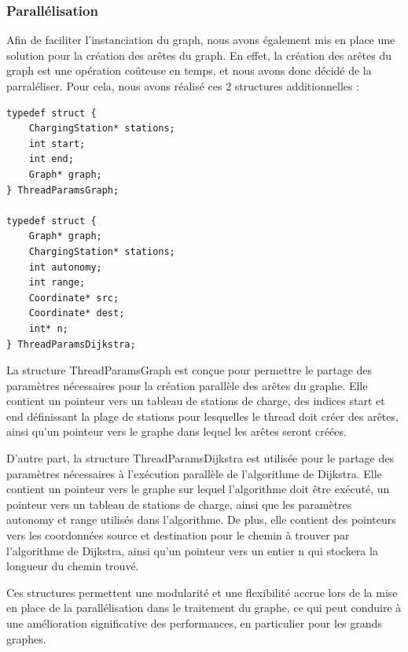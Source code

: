 \documentclass[french,a4paper]{article}
\begin{document}
\subsubsection{Parallélisation}

Afin de faciliter l'instanciation du graph, nous avons également mis en place une solution pour la création des arêtes du graph. En effet, la création des arêtes du graph est une opération coûteuse en temps, et nous avons donc décidé de la parraléliser. Pour cela, nous avons réalisé ces 2 structures additionnelles :

\begin{center}
    \begin{lstlisting}[caption=Structure Annexes à Graph]
typedef struct {
    ChargingStation* stations;
    int start;
    int end;
    Graph* graph;
} ThreadParamsGraph;

typedef struct {
    Graph* graph;
    ChargingStation* stations;
    int autonomy;
    int range;
    Coordinate* src;
    Coordinate* dest;
    int* n;
} ThreadParamsDijkstra;
\end{lstlisting}
\end{center}

La structure ThreadParamsGraph est conçue pour permettre le partage des paramètres nécessaires pour la création parallèle des arêtes du graphe. Elle contient un pointeur vers un tableau de stations de charge, des indices start et end définissant la plage de stations pour lesquelles le thread doit créer des arêtes, ainsi qu'un pointeur vers le graphe dans lequel les arêtes seront créées.

D'autre part, la structure ThreadParamsDijkstra est utilisée pour le partage des paramètres nécessaires à l'exécution parallèle de l'algorithme de Dijkstra. Elle contient un pointeur vers le graphe sur lequel l'algorithme doit être exécuté, un pointeur vers un tableau de stations de charge, ainsi que les paramètres autonomy et range utilisés dans l'algorithme. De plus, elle contient des pointeurs vers les coordonnées source et destination pour le chemin à trouver par l'algorithme de Dijkstra, ainsi qu'un pointeur vers un entier n qui stockera la longueur du chemin trouvé.

Ces structures permettent une modularité et une flexibilité accrue lors de la mise en place de la parallélisation dans le traitement du graphe, ce qui peut conduire à une amélioration significative des performances, en particulier pour les grands graphes.
\end{document}
